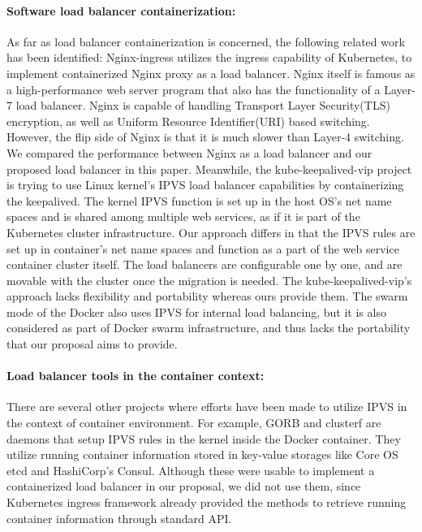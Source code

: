 \paragraph{\bf Software load balancer containerization:}
As far as load balancer containerization is concerned, the following related work has been identified:
Nginx-ingress\cite{Pleshakov2016,NginxInc2016} utilizes the ingress\cite{K8sIngress2017} capability of Kubernetes, 
to implement containerized Nginx proxy as a load balancer. Nginx itself is famous as a high-performance web server program
that also has the functionality of a Layer-7 load balancer. Nginx is capable of handling Transport Layer Security(TLS) encryption, 
as well as Uniform Resource Identifier(URI) based switching. However, the flip side of Nginx is that it is much slower than Layer-4 switching.
We compared the performance between Nginx as a load balancer and our proposed load balancer in this paper.
%
Meanwhile, the kube-keepalived-vip\cite{Prashanth2016} project is trying to use Linux kernel's IPVS\cite{Zhang2000} 
load balancer capabilities by containerizing the keepalived\cite{ACassen2016}.
The kernel IPVS function is set up in the host OS's net name spaces and is shared among multiple web services,
as if it is part of the Kubernetes cluster infrastructure.
Our approach differs in that the IPVS rules are set up in container's net name spaces 
and function as a part of the web service container cluster itself.
The load balancers are configurable one by one, and are  movable with the cluster once the migration is needed.
The kube-keepalived-vip's approach lacks flexibility and portability whereas ours provide them.
%
The swarm mode of the Docker\cite{DockerCoreEngineering2016,DockerInc2017} also uses IPVS for internal load balancing,
but it is also considered as part of Docker swarm infrastructure, 
and thus lacks the portability that our proposal aims to provide.

\paragraph{\bf Load balancer tools in the container context:}
There are several other projects where efforts have been made to utilize IPVS in the context of container environment.
For example, GORB\cite{Sibiryov2015} and clusterf\cite{Aaltodoc:http://urn.fi/URN:NBN:fi:aalto-201611025433} are daemons 
that setup IPVS rules in the kernel inside the Docker container. 
They utilize running container information stored in key-value storages
like Core OS etcd\cite{CoreOSEtcd} and HashiCorp's Consul\cite{HashiCorpConsul}. 
Although these were usable to implement a containerized load balancer in our proposal, we did not use them, 
since Kubernetes ingress framework already provided the methods to retrieve running container information through standard API.

